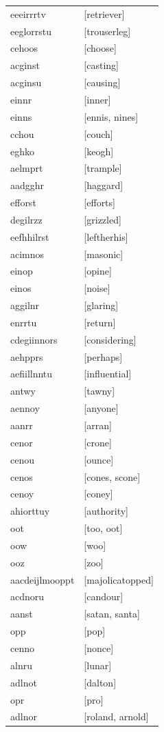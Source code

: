 \documentclass{article}
\begin{document}
\begin{tabular}{ll}
eeeirrrtv & [retriever] \\
eeglorrstu & [trouserleg] \\
cehoos & [choose] \\
acginst & [casting] \\
acginsu & [causing] \\
einnr & [inner] \\
einns & [ennis, nines] \\
cchou & [couch] \\
eghko & [keogh] \\
aelmprt & [trample] \\
aadgghr & [haggard] \\
efforst & [efforts] \\
degilrzz & [grizzled] \\
eefhhilrst & [leftherhis] \\
acimnos & [masonic] \\
einop & [opine] \\
einos & [noise] \\
aggilnr & [glaring] \\
enrrtu & [return] \\
cdegiinnors & [considering] \\
aehpprs & [perhaps] \\
aefiillnntu & [influential] \\
antwy & [tawny] \\
aennoy & [anyone] \\
aanrr & [arran] \\
cenor & [crone] \\
cenou & [ounce] \\
cenos & [cones, scone] \\
cenoy & [coney] \\
ahiorttuy & [authority] \\
oot & [too, oot] \\
oow & [woo] \\
ooz & [zoo] \\
aacdeijlmooppt & [majolicatopped] \\
acdnoru & [candour] \\
aanst & [satan, santa] \\
opp & [pop] \\
cenno & [nonce] \\
alnru & [lunar] \\
adlnot & [dalton] \\
opr & [pro] \\
adlnor & [roland, arnold] \\

\end{tabular}
\end{document}
